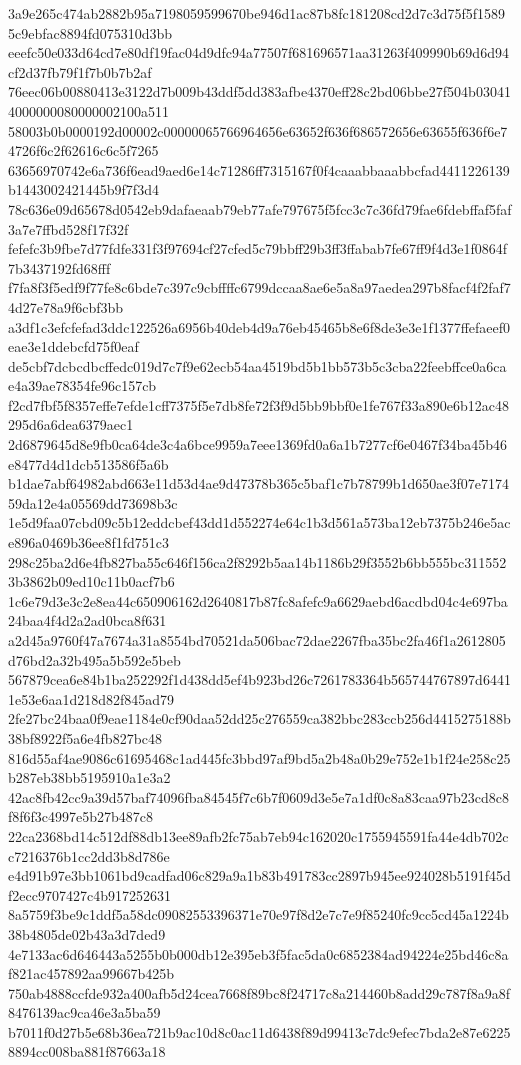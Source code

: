 {3a9e265c474ab2882b95a7198059599670be946d1ac87b8fc181208cd2d7c3d75f5f15895c9ebfac8894fd075310d3bb
eeefc50e033d64cd7e80df19fac04d9dfc94a77507f681696571aa31263f409990b69d6d94cf2d37fb79f1f7b0b7b2af
76eec06b00880413e3122d7b009b43ddf5dd383afbe4370eff28c2bd06bbe27f504b030414000000080000002100a511
58003b0b0000192d00002c00000065766964656e63652f636f686572656e63655f636f6e74726f6c2f62616c6c5f7265
63656970742e6a736f6ead9aed6e14c71286ff7315167f0f4caaabbaaabbcfad4411226139b1443002421445b9f7f3d4
78c636e09d65678d0542eb9dafaeaab79eb77afe797675f5fcc3c7c36fd79fae6fdebffaf5faf3a7e7ffbd528f17f32f
fefefc3b9fbe7d77fdfe331f3f97694cf27cfed5c79bbff29b3ff3ffabab7fe67ff9f4d3e1f0864f7b3437192fd68fff
f7fa8f3f5edf9f77fe8c6bde7c397c9cbffffc6799dccaa8ae6e5a8a97aedea297b8facf4f2faf74d27e78a9f6cbf3bb
a3df1c3efcfefad3ddc122526a6956b40deb4d9a76eb45465b8e6f8de3e3e1f1377ffefaeef0eae3e1ddebcfd75f0eaf
de5cbf7dcbcdbcffedc019d7c7f9e62ecb54aa4519bd5b1bb573b5c3cba22feebffce0a6cae4a39ae78354fe96c157cb
f2cd7fbf5f8357effe7efde1cff7375f5e7db8fe72f3f9d5bb9bbf0e1fe767f33a890e6b12ac48295d6a6dea6379aec1
2d6879645d8e9fb0ca64de3c4a6bce9959a7eee1369fd0a6a1b7277cf6e0467f34ba45b46e8477d4d1dcb513586f5a6b
b1dae7abf64982abd663e11d53d4ae9d47378b365c5baf1c7b78799b1d650ae3f07e717459da12e4a05569dd73698b3c
1e5d9faa07cbd09c5b12eddcbef43dd1d552274e64c1b3d561a573ba12eb7375b246e5ace896a0469b36ee8f1fd751c3
298c25ba2d6e4fb827ba55c646f156ca2f8292b5aa14b1186b29f3552b6bb555bc3115523b3862b09ed10c11b0acf7b6
1c6e79d3e3c2e8ea44c650906162d2640817b87fc8afefc9a6629aebd6acdbd04c4e697ba24baa4f4d2a2ad0bca8f631
a2d45a9760f47a7674a31a8554bd70521da506bac72dae2267fba35bc2fa46f1a2612805d76bd2a32b495a5b592e5beb
567879cea6e84b1ba252292f1d438dd5ef4b923bd26c7261783364b565744767897d64411e53e6aa1d218d82f845ad79
2fe27bc24baa0f9eae1184e0cf90daa52dd25c276559ca382bbc283ccb256d4415275188b38bf8922f5a6e4fb827bc48
816d55af4ae9086c61695468c1ad445fc3bbd97af9bd5a2b48a0b29e752e1b1f24e258c25b287eb38bb5195910a1e3a2
42ac8fb42cc9a39d57baf74096fba84545f7c6b7f0609d3e5e7a1df0c8a83caa97b23cd8c8f8f6f3c4997e5b27b487c8
22ca2368bd14c512df88db13ee89afb2fc75ab7eb94c162020c1755945591fa44e4db702cc7216376b1cc2dd3b8d786e
e4d91b97e3bb1061bd9cadfad06c829a9a1b83b491783cc2897b945ee924028b5191f45df2ecc9707427c4b917252631
8a5759f3be9c1ddf5a58dc09082553396371e70e97f8d2e7c7e9f85240fc9cc5cd45a1224b38b4805de02b43a3d7ded9
4e7133ac6d646443a5255b0b000db12e395eb3f5fac5da0c6852384ad94224e25bd46c8af821ac457892aa99667b425b
750ab4888ccfde932a400afb5d24cea7668f89bc8f24717c8a214460b8add29c787f8a9a8f8476139ac9ca46e3a5ba59
b7011f0d27b5e68b36ea721b9ac10d8c0ac11d6438f89d99413c7dc9efec7bda2e87e62258894cc008ba881f87663a18
}
